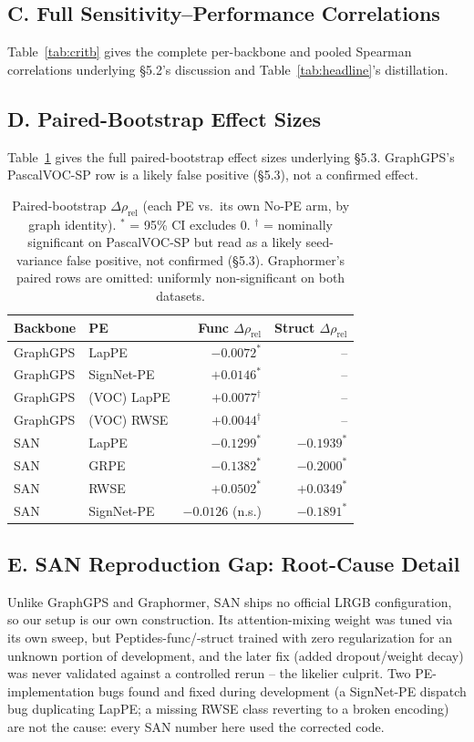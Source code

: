 \documentclass[10pt]{article}
\begin{document}
{\subsection*{C. Full Sensitivity--Performance Correlations}
Table~\ref{tab:critb} gives the complete per-backbone and pooled Spearman correlations underlying \S5.2's discussion and Table~\ref{tab:headline}'s distillation.


\subsection*{D. Paired-Bootstrap Effect Sizes}
\label{app:paired}
Table~\ref{tab:paired} gives the full paired-bootstrap effect sizes underlying \S5.3. GraphGPS's PascalVOC-SP row is a likely false positive (\S5.3), not a confirmed effect.
\begin{table}[h]
\centering\footnotesize
\setlength{\tabcolsep}{3pt}
\begin{tabular}{llrr}
\toprule
\textbf{Backbone} & \textbf{PE} & \textbf{Func $\Delta\rho_{\text{rel}}$} & \textbf{Struct $\Delta\rho_{\text{rel}}$} \\
\midrule
GraphGPS & LapPE & $-0.0072^{*}$ & -- \\
GraphGPS & SignNet-PE & $+0.0146^{*}$ & -- \\
GraphGPS & (VOC) LapPE & $+0.0077^{\dagger}$ & -- \\
GraphGPS & (VOC) RWSE & $+0.0044^{\dagger}$ & -- \\
\addlinespace
SAN & LapPE & $-0.1299^{*}$ & $-0.1939^{*}$ \\
SAN & GRPE & $-0.1382^{*}$ & $-0.2000^{*}$ \\
SAN & RWSE & $+0.0502^{*}$ & $+0.0349^{*}$ \\
SAN & SignNet-PE & $-0.0126$ (n.s.) & $-0.1891^{*}$ \\
\bottomrule
\end{tabular}
\caption{Paired-bootstrap $\Delta\rho_{\text{rel}}$ (each PE vs.\ its own No-PE arm, by graph identity). $^{*}$ = 95\% CI excludes 0. $^{\dagger}$ = nominally significant on PascalVOC-SP but read as a likely seed-variance false positive, not confirmed (\S5.3). Graphormer's paired rows are omitted: uniformly non-significant on both datasets.}
\label{tab:paired}
\end{table}

\subsection*{E. SAN Reproduction Gap: Root-Cause Detail}
\label{app:sangap}
Unlike GraphGPS and Graphormer, SAN ships no official LRGB configuration, so our setup is our own construction. Its attention-mixing weight was tuned via its own sweep, but Peptides-func/-struct trained with zero regularization for an unknown portion of development, and the later fix (added dropout/weight decay) was never validated against a controlled rerun -- the likelier culprit. Two PE-implementation bugs found and fixed during development (a SignNet-PE dispatch bug duplicating LapPE; a missing RWSE class reverting to a broken encoding) are not the cause: every SAN number here used the corrected code.


}
\end{document}
